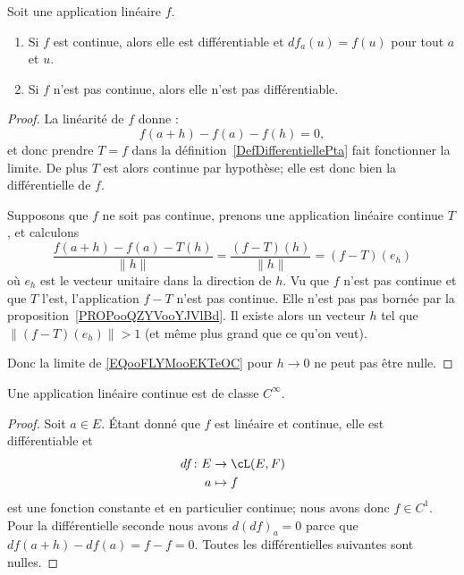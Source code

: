\begin{lemma}       \label{LemooXXUGooUqCjmp}
    Soit une application linéaire \( f\).
    \begin{enumerate}
        \item
            Si \( f\) est continue, alors elle est différentiable et \( df_a(u)=f(u)\) pour tout \( a\) et \( u\).
        \item
            Si \( f\) n'est pas continue, alors elle n'est pas différentiable.
    \end{enumerate}
\end{lemma}

\begin{proof}
    La linéarité de \( f\) donne :
    \begin{equation}
        f(a+h)-f(a)-f(h)=0,
    \end{equation}
    et donc prendre \( T=f\) dans la définition~\ref{DefDifferentiellePta} fait fonctionner la limite. De plus \( T\) est alors continue par hypothèse; elle est donc bien la différentielle de \( f\).

    Supposons que \( f\) ne soit pas continue, prenons une application linéaire continue \( T\), et calculons
    \begin{equation}        \label{EQooFLYMooEKTeOC}
        \frac{ f(a+h)-f(a)-T(h) }{ \| h \| }=\frac{ (f-T)(h) }{ \| h \| }=(f-T)(e_h)
    \end{equation}
    où \( e_h\) est le vecteur unitaire dans la direction de \( h\). Vu que \( f\) n'est pas continue et que \( T\) l'est, l'application \( f-T\) n'est pas continue. Elle n'est pas pas bornée par la proposition~\ref{PROPooQZYVooYJVlBd}. Il existe alors un vecteur \( h\) tel que \( \| (f-T)(e_h) \|>1\) (et même plus grand que ce qu'on veut).

    Donc la limite de \eqref{EQooFLYMooEKTeOC} pour \( h\to 0\) ne peut pas être nulle.
\end{proof}

\begin{lemma}   \label{LemLLvgPQW}
    Une application linéaire continue est de classe \(  C^{\infty}\).
\end{lemma}

\begin{proof}
    Soit \( a\in E\). Étant donné que \( f\) est linéaire et continue, elle est différentiable et
    \begin{equation}
        \begin{aligned}
            df\colon E&\to \cL(E,F) \\
            a&\mapsto f
        \end{aligned}
    \end{equation}
    est une fonction constante et en particulier continue; nous avons donc \( f\in C^1\). Pour la différentielle seconde nous avons \( d(df)_a=0\) parce que \( df(a+h)-df(a)=f-f=0\). Toutes les différentielles suivantes sont nulles.
\end{proof}

